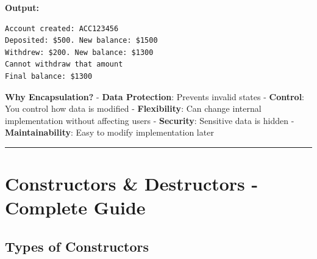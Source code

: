 \textbf{Output:}

\begin{lstlisting}
Account created: ACC123456
Deposited: $500. New balance: $1500
Withdrew: $200. New balance: $1300
Cannot withdraw that amount
Final balance: $1300
\end{lstlisting}

\textbf{Why Encapsulation?} - \textbf{Data Protection}: Prevents invalid
states - \textbf{Control}: You control how data is modified -
\textbf{Flexibility}: Can change internal implementation without
affecting users - \textbf{Security}: Sensitive data is hidden -
\textbf{Maintainability}: Easy to modify implementation later

\begin{center}\rule{0.5\linewidth}{0.5pt}\end{center}

\hypertarget{constructors-destructors---complete-guide}{%
\section{Constructors \& Destructors - Complete
Guide}\label{constructors-destructors---complete-guide}}

\hypertarget{types-of-constructors}{%
\subsection{Types of Constructors}\label{types-of-constructors}}

